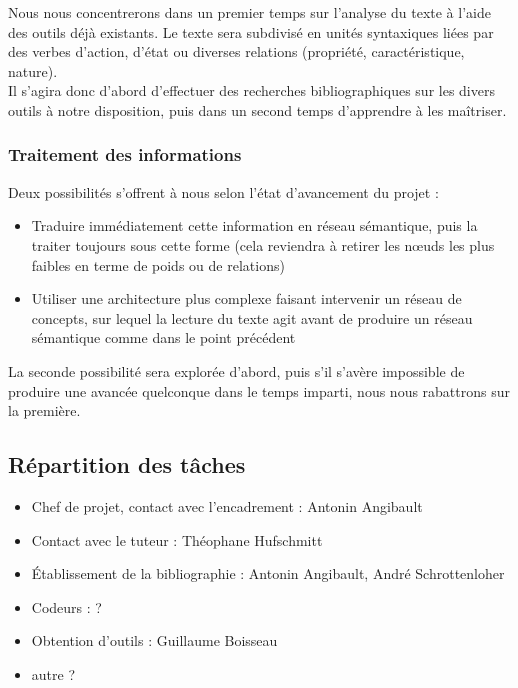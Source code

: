 \documentclass{article}           %
\begin{document}
Nous nous concentrerons dans un premier temps sur l'analyse du texte à l'aide des outils déjà existants. Le texte sera subdivisé en unités syntaxiques liées par des verbes d'action, d'état ou diverses relations (propriété, caractéristique, nature).\\

Il s'agira donc d'abord d'effectuer des recherches bibliographiques sur les divers outils à notre disposition, puis dans un second temps d'apprendre à les ma\^{i}triser.

\subsubsection{Traitement des informations}

Deux possibilités s'offrent à nous selon l'état d'avancement du projet :\\
\begin{itemize}
 \item Traduire immédiatement cette information en réseau sémantique, puis la traiter toujours sous cette forme (cela reviendra à retirer les nœuds les plus faibles en terme de poids ou de relations)
 \item Utiliser une architecture plus complexe faisant intervenir un réseau de concepts, sur lequel la lecture du texte agit avant de produire un réseau sémantique comme dans le point précédent 
\end{itemize}
La seconde possibilité sera explorée d'abord, puis s'il s'avère impossible de produire une avancée quelconque dans le temps imparti, nous nous rabattrons sur la première.

\subsection{Répartition des tâches}%
\begin{itemize}
	\item Chef de projet, contact avec l'encadrement : Antonin Angibault
	\item Contact avec le tuteur : Théophane Hufschmitt
	\item Établissement de la bibliographie : Antonin Angibault, André Schrottenloher
	\item Codeurs : ?
	\item Obtention d'outils : Guillaume Boisseau
	\item autre ?
\end{itemize}
\end{document}
